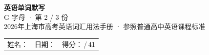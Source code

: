 \documentclass[10pt,a4paper]{article}
\begin{document}
\pagestyle{plain}

\begin{center}
{\LARGE\bfseries 英语单词默写}\\[0.22em]
{\large G 字母 · 第 2 / 3 份}\\[0.18em]
{\small 2026年上海市高考英语词汇用法手册 · 参照普通高中英语课程标准}
\end{center}

\vspace{0.25em}
\noindent\begin{tabular}{@{}p{}@{}p{}@{}p{}@{}}
姓名：\underline{\hspace{2.0cm}} & 日期：\underline{\hspace{2.0cm}} & 得分：\underline{\hspace{1.3cm}}\,/\,41 \\
\end{tabular}

\vspace{0.3em}

\vspace{0.08em}
\end{document}
